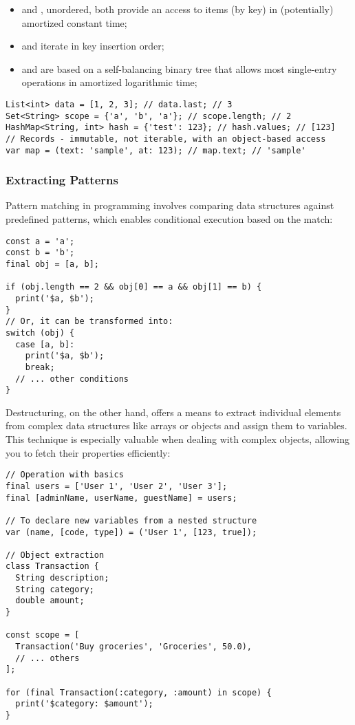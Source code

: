 \begin{itemize}
  \item {} and , unordered, both provide an access to items (by key) in (potentially) amortized 
  constant time;
  \item {} and  iterate in key insertion order;
  \item {} and  are based on a self-balancing binary tree that allows most single-entry 
  operations in amortized logarithmic time;
\end{itemize}

\begin{lstlisting}
List<int> data = [1, 2, 3]; // data.last; // 3
Set<String> scope = {'a', 'b', 'a'}; // scope.length; // 2
HashMap<String, int> hash = {'test': 123}; // hash.values; // [123]
// Records - immutable, not iterable, with an object-based access
var map = (text: 'sample', at: 123); // map.text; // 'sample'
\end{lstlisting}


\subsubsection{Extracting Patterns}

Pattern matching in programming involves comparing data structures against predefined patterns, which enables 
conditional execution based on the match:

\begin{lstlisting}
const a = 'a';
const b = 'b';
final obj = [a, b];

if (obj.length == 2 && obj[0] == a && obj[1] == b) {
  print('$a, $b');
}
// Or, it can be transformed into:
switch (obj) {
  case [a, b]:
    print('$a, $b');
    break;
  // ... other conditions
}
\end{lstlisting}

\noindent Destructuring, on the other hand, offers a means to extract individual elements from complex data structures 
like arrays or objects and assign them to variables. This technique is especially valuable when dealing with complex 
objects, allowing you to fetch their properties efficiently:

\begin{lstlisting}
// Operation with basics
final users = ['User 1', 'User 2', 'User 3'];
final [adminName, userName, guestName] = users;

// To declare new variables from a nested structure
var (name, [code, type]) = ('User 1', [123, true]);

// Object extraction
class Transaction { 
  String description;
  String category;
  double amount;
}

const scope = [
  Transaction('Buy groceries', 'Groceries', 50.0),
  // ... others
];

for (final Transaction(:category, :amount) in scope) {
  print('$category: $amount');
}
\end{lstlisting}


